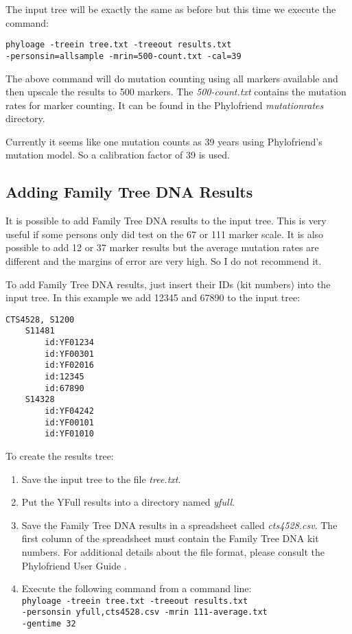 The input tree will be exactly the same as before but this time
we execute the command:

\vspace{1ex}\noindent
\texttt{phyloage -treein tree.txt -treeout results.txt\\
-personsin=allsample -mrin=500-count.txt -cal=39 }
\vspace{1ex}

\noindent The above command will do mutation counting using
all markers available and then upscale the results to 500
markers. The \emph{500-count.txt} contains the mutation rates
for marker counting. It can be found in the Phylofriend
\cite{Phylofriend} \emph{mutationrates} directory.

Currently it seems like one mutation counts as 39 years
using Phylofriend's mutation model. So a calibration factor
of 39 is used.


\subsection{Adding Family Tree DNA Results}

It is possible to add Family Tree DNA results to the input
tree. This is very useful if some persons only did test on
the 67 or 111 marker scale. It is also possible to add 12 or
37 marker results but the average mutation rates are different
and the margins of error are very high. So I do not recommend
it.

To add Family Tree DNA results, just insert their IDs
(kit numbers) into the input tree. In this example we add
12345 and 67890 to the input tree:

\begin{verbatim}
CTS4528, S1200
    S11481
        id:YF01234
        id:YF00301
        id:YF02016
        id:12345
        id:67890
    S14328
        id:YF04242
        id:YF00101
        id:YF01010
\end{verbatim}

To create the results tree:

\begin{enumerate}
\item Save the input tree to the file \emph{tree.txt}.
\item Put the YFull results into a directory named
	\emph{yfull}.
\item Save the Family Tree DNA results in a spreadsheet
	called \emph{cts4528.csv}. The first column of the 
	spreadsheet must contain the Family Tree DNA kit numbers.
	For additional details about the file format, please
	consult the Phylofriend User Guide \cite{PhylofriendUserGuide}.
\item Execute the following command from a command line:\\
	\texttt{phyloage -treein tree.txt -treeout results.txt\\
	-personsin yfull,cts4528.csv -mrin 111-average.txt\\
	-gentime 32}
\end{enumerate}

